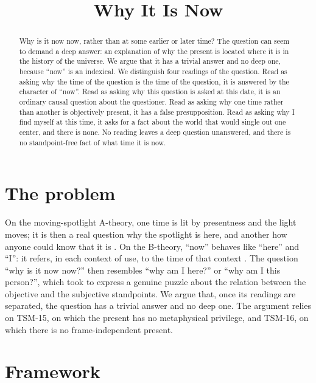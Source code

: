 \documentclass{situationist-preprint}
\title{Why It Is Now}
\begin{document}
\maketitle

\begin{abstract}
Why is it now now, rather than at some earlier or later time? The question can seem to demand a deep answer: an explanation of why the present is located where it is in the history of the universe. We argue that it has a trivial answer and no deep one, because \enquote{now} is an indexical. We distinguish four readings of the question. Read as asking why the time of the question is the time of the question, it is answered by the character of \enquote{now}. Read as asking why this question is asked at this date, it is an ordinary causal question about the questioner. Read as asking why one time rather than another is objectively present, it has a false presupposition. Read as asking why I find myself at this time, it asks for a fact about the world that would single out one center, and there is none. No reading leaves a deep question unanswered, and there is no standpoint-free fact of what time it is now.
\end{abstract}

\section{The problem}

On the moving-spotlight A-theory, one time is lit by presentness and the light moves; it is then a real question why the spotlight is here, and another how anyone could know that it is \citep{Bourne2002,BraddonMitchell2004}. On the B-theory, \enquote{now} behaves like \enquote{here} and \enquote{I}: it refers, in each context of use, to the time of that context \citep{Smart1963,Kaplan1989}. The question \enquote{why is it now now?} then resembles \enquote{why am I here?} or \enquote{why am I this person?}, which \citet{Nagel1986} took to express a genuine puzzle about the relation between the objective and the subjective standpoints. We argue that, once its readings are separated, the question has a trivial answer and no deep one. The argument relies on TSM-15, on which the present has no metaphysical privilege, and TSM-16, on which there is no frame-independent present.

\section{Framework}
\end{document}
